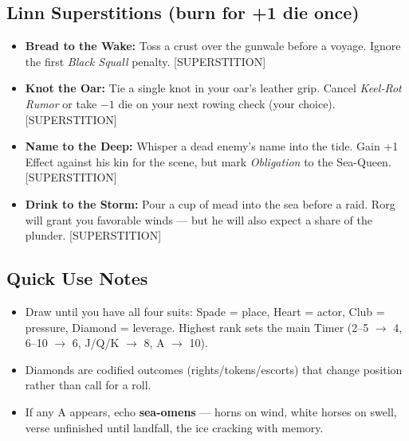 \subsection*{Linn Superstitions (burn for +1 die once)}
\begin{itemize}
  \item \textbf{Bread to the Wake:} Toss a crust over the gunwale before a voyage. Ignore the first \emph{Black Squall} penalty. [SUPERSTITION]
  \item \textbf{Knot the Oar:} Tie a single knot in your oar's leather grip. Cancel \emph{Keel-Rot Rumor} or take $-1$ die on your next rowing check (your choice). [SUPERSTITION]
  \item \textbf{Name to the Deep:} Whisper a dead enemy's name into the tide. Gain +1 Effect against his kin for the scene, but mark \emph{Obligation} to the Sea-Queen. [SUPERSTITION]
  \item \textbf{Drink to the Storm:} Pour a cup of mead into the sea before a raid. Rorg will grant you favorable winds --- but he will also expect a share of the plunder. [SUPERSTITION]
\end{itemize}

\subsection*{Quick Use Notes}
\label{sec:linn-quick-use}
\begin{itemize}
\item Draw until you have all four suits: Spade = place, Heart = actor, Club = pressure, Diamond = leverage. Highest rank sets the main Timer (2--5 $\rightarrow$ 4, 6--10 $\rightarrow$ 6, J/Q/K $\rightarrow$ 8, A $\rightarrow$ 10).
\item Diamonds are codified outcomes (rights/tokens/escorts) that change position rather than call for a roll.
\item If any A appears, echo \textbf{sea-omens} --- horns on wind, white horses on swell, verse unfinished until landfall, the ice cracking with memory.
\end{itemize}

